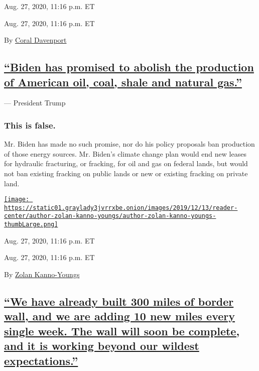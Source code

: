 Aug. 27, 2020, 11:16 p.m. ET

Aug. 27, 2020, 11:16 p.m. ET

By \href{https://www.nytimes3xbfgragh.onion/by/coral-davenport}{Coral
Davenport}

\hypertarget{biden-has-promised-to-abolish-the-production-of-american-oil-coal-shale-and-natural-gas}{%
\subsection{\texorpdfstring{\protect\hyperlink{biden-has-promised-to-abolish-the-production-of-american-oil-coal-shale-and-natural-gas}{``Biden
has promised to abolish the production of American oil, coal, shale and
natural
gas.''}}{``Biden has promised to abolish the production of American oil, coal, shale and natural gas.''}}\label{biden-has-promised-to-abolish-the-production-of-american-oil-coal-shale-and-natural-gas}}

--- President Trump

\hypertarget{this-is-false-2}{%
\subsubsection{This is false.}\label{this-is-false-2}}

Mr. Biden has made no such promise, nor do his policy proposals ban
production of those energy sources. Mr. Biden's climate change plan
would end new leases for hydraulic fracturing, or fracking, for oil and
gas on federal lands, but would not ban existing fracking on public
lands or new or existing fracking on private land.

\href{https://www.nytimes3xbfgragh.onion/by/zolan-kanno-youngs}{\texttt{[image: https://static01.graylady3jvrrxbe.onion/images/2019/12/13/reader-center/author-zolan-kanno-youngs/author-zolan-kanno-youngs-thumbLarge.png]}}

Aug. 27, 2020, 11:16 p.m. ET

Aug. 27, 2020, 11:16 p.m. ET

By \href{https://www.nytimes3xbfgragh.onion/by/zolan-kanno-youngs}{Zolan
Kanno-Youngs}

\hypertarget{we-have-already-built-300-miles-of-border-wall-and-we-are-adding-10-new-miles-every-single-week-the-wall-will-soon-be-complete-and-it-is-working-beyond-our-wildest-expectations}{%
\subsection{\texorpdfstring{\protect\hyperlink{we-have-already-built-300-miles-of-border-wall-and-we-are-adding-10-new-miles-every-single-week-the-wall-will-soon-be-complete-a}{``We
have already built 300 miles of border wall, and we are adding 10 new
miles every single week. The wall will soon be complete, and it is
working beyond our wildest
expectations.''}}{``We have already built 300 miles of border wall, and we are adding 10 new miles every single week. The wall will soon be complete, and it is working beyond our wildest expectations.''}}\label{we-have-already-built-300-miles-of-border-wall-and-we-are-adding-10-new-miles-every-single-week-the-wall-will-soon-be-complete-and-it-is-working-beyond-our-wildest-expectations}}

